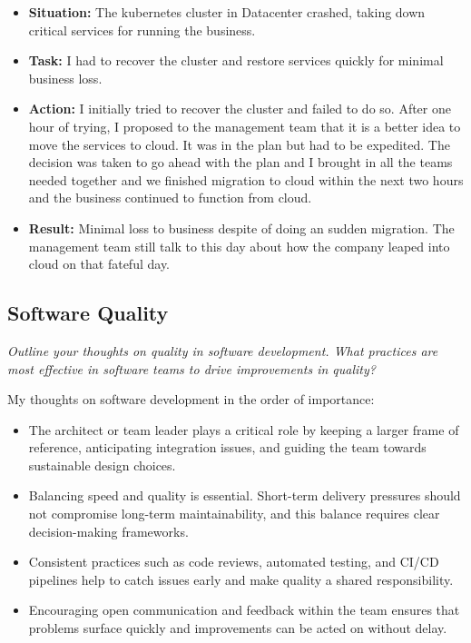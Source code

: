 \documentclass{article}
\begin{document}
\begin{itemize}
    \item \textbf{Situation: } The kubernetes cluster in Datacenter crashed, taking down critical services for running the business.
    \item \textbf{Task: } I had to recover the cluster and restore services quickly for minimal business loss.
    \item \textbf{Action: } I initially tried to recover the cluster and failed to do so. After one hour of trying, I proposed to the management team that it is 
    a better idea to move the services to cloud. It was in the plan but had to be expedited. The decision was taken to go ahead with the plan and I brought in all 
    the teams needed together and we finished migration to cloud within the next two hours and the business continued to function from cloud. 
    \item \textbf{Result: } Minimal loss to business despite of doing an sudden migration. The management team still talk to this day about how the company leaped into cloud on that fateful day.
\end{itemize}

\subsection{Software Quality}
\small \textit{Outline your thoughts on quality in software development. What practices are most effective in software teams to drive improvements in quality?} 
\normalsize 

My thoughts on software development in the order of importance:  

\begin{itemize}
    \item The architect or team leader plays a critical role by keeping a larger frame of reference, anticipating integration issues, and guiding the team towards sustainable design choices.  
    \item Balancing speed and quality is essential. Short-term delivery pressures should not compromise long-term maintainability, and this balance requires clear decision-making frameworks.  
    \item Consistent practices such as code reviews, automated testing, and CI/CD pipelines help to catch issues early and make quality a shared responsibility.  
    \item Encouraging open communication and feedback within the team ensures that problems surface quickly and improvements can be acted on without delay.  
\end{itemize}
\end{document}
